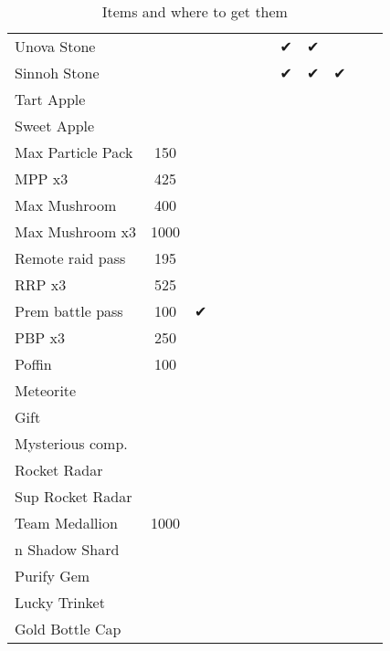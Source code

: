 \begin{table}
\begin{tabular}{p{}ccccccccccc}
Unova Stone       &      &   &           &    &     &     &  ✔  & ✔ &   &   \\
Sinnoh Stone      &      &   &           &    &     &     &  ✔  & ✔ & ✔ &   \\
Tart Apple        &      &   &           &    &     &     &     &   &   &   \\
Sweet Apple       &      &   &           &    &     &     &     &   &   &   \\
Max Particle Pack & 150  &   &           &    &     &     &     &   &   &   \\
MPP x3            & 425  &   &           &    &     &     &     &   &   &   \\
Max Mushroom      & 400  &   &           &    &     &     &     &   &   &   \\
Max Mushroom x3   & 1000 &   &           &    &     &     &     &   &   &   \\
Remote raid pass  & 195  &   &           &    &     &     &     &   &   &   \\
RRP x3            & 525  &   &           &    &     &     &     &   &   &   \\
Prem battle pass  & 100  & ✔ &           &    &     &     &     &   &   &   \\
PBP x3            & 250  &   &           &    &     &     &     &   &   &   \\
Poffin            & 100  &   &           &    &     &     &     &   &   &   \\
Meteorite         &      &   &           &    &     &     &     &   &   &   \\
Gift              &      &   &           &    &     &     &     &   &   &   \\
Mysterious comp.  &      &   &           &    &     &     &     &   &   &   \\
Rocket Radar      &      &   &           &    &     &     &     &   &   &   \\
Sup Rocket Radar  &      &   &           &    &     &     &     &   &   &   \\
Team Medallion    & 1000 &   &           &    &     &     &     &   &   &   \\n    
Shadow Shard      &      &   &           &    &     &     &     &   &   &   \\
Purify Gem        &      &   &           &    &     &     &     &   &   &   \\
Lucky Trinket     &      &   &           &    &     &     &     &   &   &   \\
Gold Bottle Cap   &      &   &           &    &     &     &     &   &   &   \\
\end{tabular}
\caption{Items and where to get them}
\end{table}
